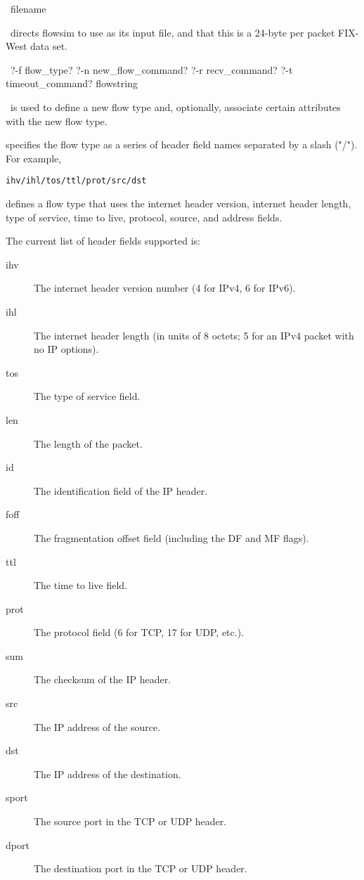 \documentclass{article}
\begin{document}
\manend


\SYNOPSIS \cmdname\ filename

\DESCRIPTION

\cmdname\ directs flowsim to use  as
its input file, and that this is a 24-byte per packet FIX-West data
set.

\SEEALSO


\manend


\SYNOPSIS \cmdname\ ?-f flow\_type? ?-n new\_flow\_command? ?-r recv\_command? ?-t timeout\_command? flowstring

\DESCRIPTION

\cmdname\ is used to define a new flow type and, optionally, associate
certain attributes with the new flow type.

 specifies the flow type as a series of header field
names separated by a slash ("/").  For example, \begin{verbatim}
ihv/ihl/tos/ttl/prot/src/dst\end{verbatim} defines a flow type that
uses the internet header version, internet header length, type of
service, time to live, protocol, source, and address fields.

The current list of header fields supported is:
\begin{description}
\item[ihv] The internet header version number (4 for IPv4, 6 for IPv6).
\item[ihl] The internet header length (in units of 8 octets; 5 for an
IPv4 packet with no IP options).
\item[tos] The type of service field.
\item[len] The length of the packet.
\item[id] The identification field of the IP header.
\item[foff] The fragmentation offset field (including the DF and MF
flags).
\item[ttl] The time to live field.
\item[prot] The protocol field (6 for TCP, 17 for UDP, etc.).
\item[sum] The checksum of the IP header.
\item[src] The IP address of the source.
\item[dst] The IP address of the destination.
\item[sport] The source port in the TCP or UDP header.
\item[dport] The destination port in the TCP or UDP header.
\end{description}
\end{document}
